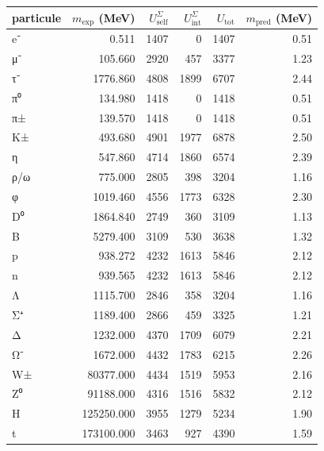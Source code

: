 \begin{center}
\small\renewcommand{\arraystretch}{1.1}
\begin{tabular}{lrrrrr}
\toprule
particule & $m_{\text{exp}}$ (MeV) & $U_{\text{self}}^{\Sigma}$ & $U_{\text{int}}^{\Sigma}$ & $U_{\text{tot}}$ & $m_{\text{pred}}$ (MeV) \\
\midrule
  e⁻ & 0.511 & 1407 & 0 & 1407 & 0.51 \\
  μ⁻ & 105.660 & 2920 & 457 & 3377 & 1.23 \\
  τ⁻ & 1776.860 & 4808 & 1899 & 6707 & 2.44 \\
  π⁰ & 134.980 & 1418 & 0 & 1418 & 0.51 \\
  π± & 139.570 & 1418 & 0 & 1418 & 0.51 \\
  K± & 493.680 & 4901 & 1977 & 6878 & 2.50 \\
  η & 547.860 & 4714 & 1860 & 6574 & 2.39 \\
  ρ/ω & 775.000 & 2805 & 398 & 3204 & 1.16 \\
  φ & 1019.460 & 4556 & 1773 & 6328 & 2.30 \\
  D⁰ & 1864.840 & 2749 & 360 & 3109 & 1.13 \\
  B & 5279.400 & 3109 & 530 & 3638 & 1.32 \\
  p & 938.272 & 4232 & 1613 & 5846 & 2.12 \\
  n & 939.565 & 4232 & 1613 & 5846 & 2.12 \\
  Λ & 1115.700 & 2846 & 358 & 3204 & 1.16 \\
  Σ⁺ & 1189.400 & 2866 & 459 & 3325 & 1.21 \\
  Δ & 1232.000 & 4370 & 1709 & 6079 & 2.21 \\
  Ω⁻ & 1672.000 & 4432 & 1783 & 6215 & 2.26 \\
  W± & 80377.000 & 4434 & 1519 & 5953 & 2.16 \\
  Z⁰ & 91188.000 & 4316 & 1516 & 5832 & 2.12 \\
  H & 125250.000 & 3955 & 1279 & 5234 & 1.90 \\
  t & 173100.000 & 3463 & 927 & 4390 & 1.59 \\
\bottomrule
\end{tabular}
\end{center}
